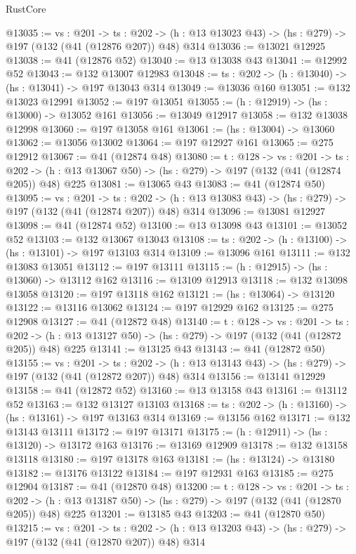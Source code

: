 \begin{lexlean}{RustCore}
\begin{coremodule}
@13035 := {vs : @201} ->
  {ts : @202} -> (h : @13 @13023 @43) -> (hs : @279) -> @197 (@132 (@41 (@12876 @207)) @48) @314
@13036 := @13021 @12925
@13038 := @41 (@12876 @52)
@13040 := @13 @13038 @43
@13041 := @12992 @52
@13043 := @132 @13007 @12983
@13048 := {ts : @202} -> (h : @13040) -> (hs : @13041) -> @197 @13043 @314
@13049 := @13036 @160
@13051 := @132 @13023 @12991
@13052 := @197 @13051
@13055 := (h : @12919) -> (hs : @13000) -> @13052 @161
@13056 := @13049 @12917
@13058 := @132 @13038 @12998
@13060 := @197 @13058 @161
@13061 := (hs : @13004) -> @13060
@13062 := @13056 @13002
@13064 := @197 @12927 @161
@13065 := @275 @12912
@13067 := @41 (@12874 @48)
@13080 := {t : @128} ->
  {vs : @201} ->
  {ts : @202} -> (h : @13 @13067 @50) -> (hs : @279) -> @197 (@132 (@41 (@12874 @205)) @48) @225
@13081 := @13065 @43
@13083 := @41 (@12874 @50)
@13095 := {vs : @201} ->
  {ts : @202} -> (h : @13 @13083 @43) -> (hs : @279) -> @197 (@132 (@41 (@12874 @207)) @48) @314
@13096 := @13081 @12927
@13098 := @41 (@12874 @52)
@13100 := @13 @13098 @43
@13101 := @13052 @52
@13103 := @132 @13067 @13043
@13108 := {ts : @202} -> (h : @13100) -> (hs : @13101) -> @197 @13103 @314
@13109 := @13096 @161
@13111 := @132 @13083 @13051
@13112 := @197 @13111
@13115 := (h : @12915) -> (hs : @13060) -> @13112 @162
@13116 := @13109 @12913
@13118 := @132 @13098 @13058
@13120 := @197 @13118 @162
@13121 := (hs : @13064) -> @13120
@13122 := @13116 @13062
@13124 := @197 @12929 @162
@13125 := @275 @12908
@13127 := @41 (@12872 @48)
@13140 := {t : @128} ->
  {vs : @201} ->
  {ts : @202} -> (h : @13 @13127 @50) -> (hs : @279) -> @197 (@132 (@41 (@12872 @205)) @48) @225
@13141 := @13125 @43
@13143 := @41 (@12872 @50)
@13155 := {vs : @201} ->
  {ts : @202} -> (h : @13 @13143 @43) -> (hs : @279) -> @197 (@132 (@41 (@12872 @207)) @48) @314
@13156 := @13141 @12929
@13158 := @41 (@12872 @52)
@13160 := @13 @13158 @43
@13161 := @13112 @52
@13163 := @132 @13127 @13103
@13168 := {ts : @202} -> (h : @13160) -> (hs : @13161) -> @197 @13163 @314
@13169 := @13156 @162
@13171 := @132 @13143 @13111
@13172 := @197 @13171
@13175 := (h : @12911) -> (hs : @13120) -> @13172 @163
@13176 := @13169 @12909
@13178 := @132 @13158 @13118
@13180 := @197 @13178 @163
@13181 := (hs : @13124) -> @13180
@13182 := @13176 @13122
@13184 := @197 @12931 @163
@13185 := @275 @12904
@13187 := @41 (@12870 @48)
@13200 := {t : @128} ->
  {vs : @201} ->
  {ts : @202} -> (h : @13 @13187 @50) -> (hs : @279) -> @197 (@132 (@41 (@12870 @205)) @48) @225
@13201 := @13185 @43
@13203 := @41 (@12870 @50)
@13215 := {vs : @201} ->
  {ts : @202} -> (h : @13 @13203 @43) -> (hs : @279) -> @197 (@132 (@41 (@12870 @207)) @48) @314

\end{coremodule}
\end{lexlean}
